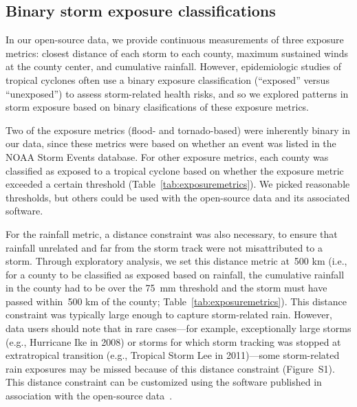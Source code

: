 \subsection*{Binary storm exposure classifications}

In our open-source data, we provide continuous measurements of three exposure
metrics: closest distance of each storm to each county, maximum sustained winds
at the county center, and cumulative rainfall. However, epidemiologic studies
of tropical cyclones often use a binary exposure classification (``exposed''
versus ``unexposed'') to assess storm-related health risks, and so we
explored patterns in storm exposure based on binary clasifications of
these exposure metrics. 

Two of the exposure metrics (flood- and tornado-based) were inherently binary
in our data, since these metrics were based on whether an event was listed in
the NOAA Storm Events database.  For other exposure metrics, each county
was classified as exposed to a tropical cyclone based on whether the exposure
metric exceeded a certain threshold (Table~\ref{tab:exposuremetrics}). We
picked reasonable thresholds, but others could be used with the open-source
data and its associated software. 

For the rainfall metric, a distance constraint was also necessary, to ensure
that rainfall unrelated and far from the storm track were not misattributed to a
storm. Through exploratory analysis, we set this distance metric at~500
\si{\kilo\metre} (i.e., for a county to be classified as exposed based on
rainfall, the cumulative rainfall in the county had to be over the
75~\si{\milli\metre} threshold and the storm must have passed within~500
\si{\kilo\metre} of the county; Table~\ref{tab:exposuremetrics}). This distance
constraint was typically large enough to capture storm-related rain.  However,
data users should note that in rare cases---for example, exceptionally large
storms (e.g., Hurricane Ike in 2008) or storms for which storm tracking was
stopped at extratropical transition (e.g., Tropical Storm Lee in 2011)---some
storm-related rain exposures may be missed because of this distance constraint
(Figure~S1). This distance constraint can be customized using the software
published in association with the open-source
data~\parencite{hurricaneexposure}.

